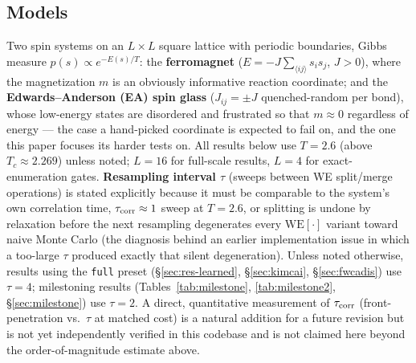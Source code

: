 \documentclass[a4paper,fleqn]{cas-sc}
\begin{document}
\FloatBarrier

\subsection{Models}\label{sec:models}
Two spin systems on an $L\times L$ square lattice with periodic boundaries, Gibbs measure
$p(s)\propto e^{-E(s)/T}$: the \textbf{ferromagnet} ($E=-J\sum_{\langle ij\rangle}s_is_j$,
$J>0$), where the magnetization $m$ is an obviously informative reaction coordinate; and
the \textbf{Edwards--Anderson (EA) spin glass} ($J_{ij}=\pm J$ quenched-random per bond),
whose low-energy states are disordered and frustrated so that $m\approx 0$ regardless of
energy --- the case a hand-picked coordinate is expected to fail on, and the one this paper
focuses its harder tests on. All results below use $T=2.6$ (above $T_c\approx2.269$) unless
noted; $L=16$ for full-scale results, $L=4$ for exact-enumeration gates. \textbf{Resampling
	interval $\tau$} (sweeps between WE split/merge operations) is stated explicitly because it
must be comparable to the system's own correlation time, $\tau_{\rm corr}\approx1$ sweep at
$T=2.6$, or splitting is undone by relaxation before the next resampling degenerates every
$\mathrm{WE}[\cdot]$ variant toward naive Monte Carlo (the diagnosis behind an earlier
implementation issue in which a too-large $\tau$ produced exactly that silent degeneration).
Unless noted otherwise, results using the \texttt{full} preset (\S\ref{sec:res-learned},
\S\ref{sec:kimcai}, \S\ref{sec:fwcadis}) use $\tau=4$; milestoning results
(Tables~\ref{tab:milestone}, \ref{tab:milestone2}, \S\ref{sec:milestone}) use $\tau=2$. A
direct, quantitative measurement of $\tau_{\rm corr}$ (front-penetration vs.\ $\tau$ at
matched cost) is a natural addition for a future revision but is not yet independently
verified in this codebase and is not claimed here beyond the order-of-magnitude estimate
above.
\end{document}
